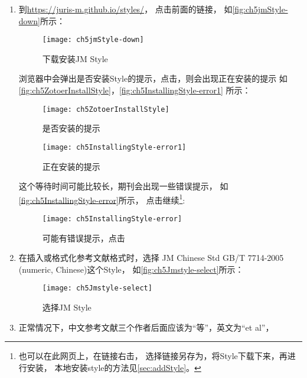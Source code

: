 \documentclass[cn,11pt,chinese]{elegantbook}
\begin{document}
			\begin{enumerate}
				\item 到\url{https://juris-m.github.io/styles/}，
				点击前面的链接，
				如\autoref{fig:ch5jmStyle-down}所示：
				\begin{figure}[htbp]
					\centering
					\texttt{[image: ch5jmStyle-down]}
					\caption{下载安装JM Style}
					\label{fig:ch5jmStyle-down}
				\end{figure}
				浏览器中会弹出是否安装Style的提示，点击，则会出现正在安装的提示
				如\autoref{fig:ch5ZotoerInstallStyle}，\autoref{fig:ch5InstallingStyle-error1}
				所示：
				\begin{figure}[htbp]
					\centering
					\begin{minipage}[t]{\dimexpr0.5\textwidth-4em}
						\centering
						\texttt{[image: ch5ZotoerInstallStyle]}
						\caption{是否安装的提示}
						\label{fig:ch5ZotoerInstallStyle}
					\end{minipage}
					\begin{minipage}[t]{\dimexpr0.5\textwidth-4em}
						\centering
						\texttt{[image: ch5InstallingStyle-error1]}
						\caption{正在安装的提示}
						\label{fig:ch5InstallingStyle-error1}
					\end{minipage}
				\end{figure}
				这个等待时间可能比较长，期刊会出现一些错误提示，
				如
				\autoref{fig:ch5InstallingStyle-error}所示，
				点击继续\footnote{也可以在此网页上，在链接右击，
				选择链接另存为，将Style下载下来，再进行安装，
				本地安装style的方法见\cref{sec:addStyle}。}:
				\begin{figure}[htbp]
					\centering
						\texttt{[image: ch5InstallingStyle-error]}
						\caption{可能有错误提示，点击}
						\label{fig:ch5InstallingStyle-error}
					\end{figure}
			\item 在插入或格式化参考文献格式时，选择
				JM Chinese Std GB/T 7714-2005 (numeric, Chinese)这个Style，
				如\autoref{fig:ch5Jmstyle-select}所示：
				\begin{figure}[htbp]
					\centering
					\texttt{[image: ch5Jmstyle-select]}
					\caption{选择JM Style}
					\label{fig:ch5Jmstyle-select}
				\end{figure}
			\item 正常情况下，中文参考文献三个作者后面应该为“等”，英文为“et al”，

\end{enumerate}
\end{document}
